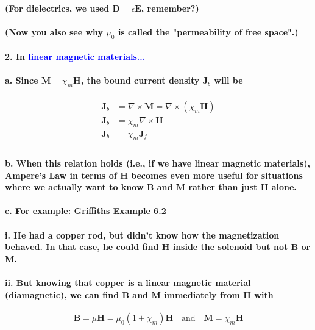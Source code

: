 \documentclass{article}
\begin{document}
\paragraph{(For dielectrics, we used $\boldsymbol{D}=\epsilon\boldsymbol{E}$, remember?)}
\paragraph{(Now you also see why $\mu_0$ is called the "permeability of free space".)}
\paragraph{2. In \textcolor{blue}{linear magnetic materials...}}
\paragraph{\indent a. Since $\boldsymbol{M}=\chi_m\boldsymbol{H}$, the bound current density $\boldsymbol{J}_b$ will be}
\begin{align*}
    \boldsymbol{J}_b&=\nabla\times\boldsymbol{M}=\nabla\times(\chi_m\boldsymbol{H})\\
    \boldsymbol{J}_b&=\chi_m\nabla\times\boldsymbol{H}\\
    \boldsymbol{J}_b&=\chi_m\boldsymbol{J}_f\\
\end{align*}    
\paragraph{\indent b. When this relation holds (i.e., if we have linear magnetic materials), Ampere's Law in terms of $\boldsymbol{H}$ becomes even more useful for situations where we actually want to know $\boldsymbol{B}$ and $\boldsymbol{M}$ rather than just $\boldsymbol{H}$ alone.}
\paragraph{\indent c. For example: Griffiths Example 6.2}
\paragraph{\indent\indent i. He had a copper rod, but didn't know how the magnetization behaved. In that case, he could find $\boldsymbol{H}$ inside the solenoid but not $\boldsymbol{B}$ or $\boldsymbol{M}$.}
\paragraph{\indent\indent ii. But knowing that copper is a linear magnetic material (diamagnetic), we can find $\boldsymbol{B}$ and $\boldsymbol{M}$ immediately from $\boldsymbol{H}$ with}
\begin{equation*}
    \boldsymbol{B}=\mu\boldsymbol{H}=\mu_0(1+\chi_m)\boldsymbol{H} \quad\text{and}\quad \boldsymbol{M}=\chi_m\boldsymbol{H}
\end{equation*}
\end{document}
